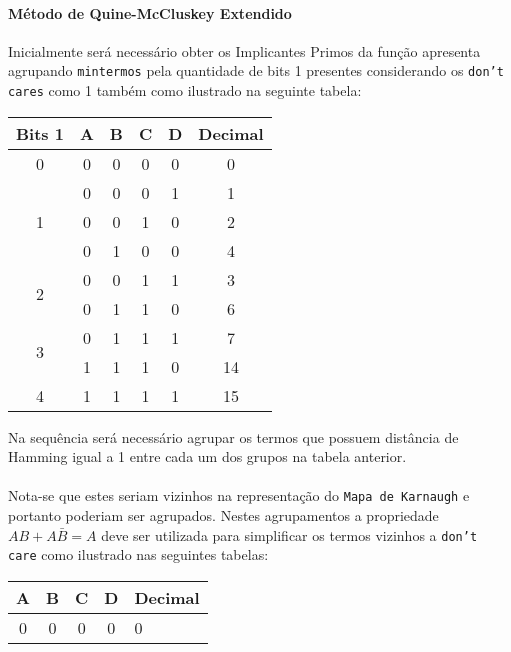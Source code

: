 \documentclass{article}
\begin{document}
\begin{resolution}
                \paragraph{Método de Quine-McCluskey Extendido}Inicialmente será necessário obter os Implicantes Primos da função apresenta agrupando \texttt{mintermos} pela quantidade de bits 1 presentes considerando os \texttt{don't cares} como 1 também como ilustrado na seguinte tabela:
                \begin{table}[H]
                    \centering\begin{tabular}{c cccc c}
                        Bits 1             &A&B&C&D& Decimal\\\hline
                        0                  &0&0&0&0& 0\\\hline
                        \multirow{3}{*}{1} &0&0&0&1& 1\\
                                           &0&0&1&0& 2\\
                                           &0&1&0&0& 4\\\hline
                        \multirow{2}{*}{2} &0&0&1&1& 3\\
                                           &0&1&1&0& 6\\\hline
                        \multirow{2}{*}{3} &0&1&1&1& 7\\
                                           &1&1&1&0& 14\\\hline
                        4                  &1&1&1&1& 15\\\hline
                    \end{tabular}
                \end{table}\noindent
                Na sequência será necessário agrupar os termos que possuem distância de Hamming igual a 1 entre cada um dos grupos na tabela anterior.
                \\\\
                Nota-se que estes seriam vizinhos na representação do \texttt{Mapa de Karnaugh} e portanto poderiam ser agrupados. Nestes agrupamentos a propriedade $AB + A\bar{B} = A$ deve ser utilizada para simplificar os termos vizinhos a \texttt{don't care} como ilustrado nas seguintes tabelas:
                \begin{table}[H]
                    \centering\begin{tabular}{cccc l}
                        A&B&C&D& Decimal\\\hline
                        0&0&0&0& 0\\\hline

\end{tabular}
\end{table}
\end{resolution}
\end{document}

